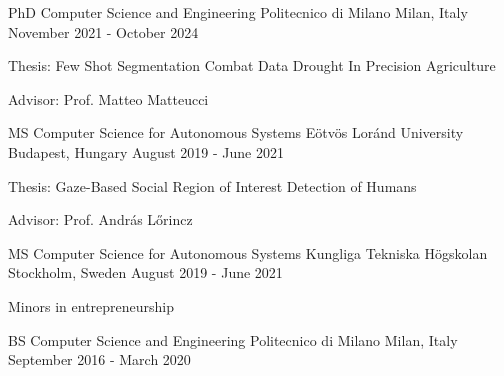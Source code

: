 

\begin{cventries}

  \cventry
    {PhD Computer Science and Engineering } %
    {Politecnico di Milano} %
    {Milan, Italy} %
    {November 2021 - October 2024} %
    {
      \begin{cvitems} %
        \item {Thesis: Few Shot Segmentation Combat Data Drought In Precision Agriculture}
        \item {Advisor: Prof. Matteo Matteucci}
      \end{cvitems}
    }
  \cventry
    {MS Computer Science for Autonomous Systems} %
    {Eötvös Loránd University} %
    {Budapest, Hungary} %
    {August 2019 - June 2021} %
    {
      \begin{cvitems} %
        \item {Thesis: Gaze-Based Social Region of Interest Detection of Humans}
        \item {Advisor: Prof. András Lőrincz}
      \end{cvitems}
    }

  \cventry
    {MS Computer Science for Autonomous Systems} %
    {Kungliga Tekniska Högskolan} %
    {Stockholm, Sweden} %
    {August 2019 - June 2021} %
    { 
      \begin{cvitems}
        \item {Minors in entrepreneurship}
      \end{cvitems}
    }

  \cventry
    {BS Computer Science and Engineering} %
    {Politecnico di Milano} %
    {Milan, Italy} %
    {September 2016 - March 2020} %
    { }

\end{cventries}
